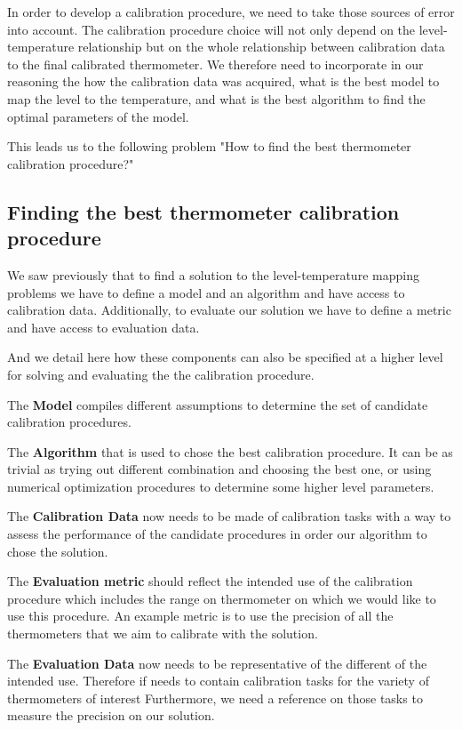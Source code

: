 \begin{bibunit}
In order to develop a calibration procedure, we need to take those sources of error into account. The calibration procedure choice will not only depend on the level-temperature relationship but on the whole relationship between calibration data to the final calibrated thermometer. We therefore need to incorporate in our reasoning the how the calibration data was acquired, what is the best model to map the level to the temperature, and what is the best algorithm to find the optimal parameters of the model.

This leads us to the following problem "How to find the best thermometer calibration procedure?"

\subsection{Finding the best thermometer calibration procedure}

We saw previously that to find a solution to the level-temperature mapping problems we have to define a model and an algorithm and have access to calibration data.
Additionally, to evaluate our solution we have to define a metric and have access to evaluation data.

And we detail here how these components can also be specified at a higher level for solving and evaluating the the calibration procedure.


The \textbf{Model} compiles different assumptions to determine the set of candidate calibration procedures.

The \textbf{Algorithm} that is used to chose the best calibration procedure. It can be as trivial as trying out different combination and choosing the best one, or using numerical optimization procedures to determine some higher level parameters. 

The  \textbf{Calibration Data} now needs to be made of calibration tasks with a way to assess the performance of the candidate procedures in order our algorithm to chose the solution.

The \textbf{Evaluation metric} should reflect the intended use of the calibration procedure which includes the range on thermometer on which we would like to use this procedure. An example metric is to use the precision of all the thermometers that we aim to calibrate with the solution.

The \textbf{Evaluation Data} now needs to be representative of the different of the intended use.
Therefore if needs to contain calibration tasks for the variety of thermometers of interest
Furthermore, we need a reference on those tasks to measure the precision on our solution. 




\end{bibunit}
